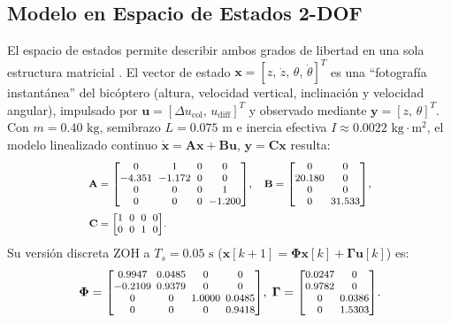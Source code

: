 \documentclass[conference]{IEEEtran}
\begin{document}
\subsection{Modelo en Espacio de Estados 2-DOF}
El espacio de estados permite describir ambos grados de libertad en una sola estructura matricial \cite{cayetano_ss}. El vector de estado $\mathbf{x} = [z,\, \dot{z},\, \theta,\, \dot{\theta}]^T$ es una ``fotograf\'{i}a instant\'{a}nea'' del bic\'{o}ptero (altura, velocidad vertical, inclinaci\'{o}n y velocidad angular), impulsado por $\mathbf{u} = [\Delta u_{\text{col}},\, u_{\text{diff}}]^T$ y observado mediante $\mathbf{y} = [z,\, \theta]^T$. Con $m = 0.40\text{ kg}$, semibrazo $L = 0.075\text{ m}$ e inercia efectiva $I \approx 0.0022\text{ kg}\cdot\text{m}^2$, el modelo linealizado continuo $\dot{\mathbf{x}} = \mathbf{A}\mathbf{x} + \mathbf{B}\mathbf{u}$, $\mathbf{y} = \mathbf{C}\mathbf{x}$ resulta:
\begin{equation}
  \setlength{\arraycolsep}{2.6pt}
  \footnotesize
  \begin{aligned}
    \mathbf{A} &=
    \begin{bmatrix}
      0 & 1 & 0 & 0 \\
      -4.351 & -1.172 & 0 & 0 \\
      0 & 0 & 0 & 1 \\
      0 & 0 & 0 & -1.200
    \end{bmatrix}\!,\quad
    \mathbf{B} =
    \begin{bmatrix}
      0 & 0 \\
      20.180 & 0 \\
      0 & 0 \\
      0 & 31.533
    \end{bmatrix}\!, \\
    \mathbf{C} &=
    \begin{bmatrix}
      1 & 0 & 0 & 0 \\
      0 & 0 & 1 & 0
    \end{bmatrix}\!.
  \end{aligned}
  \label{eq:ss_cont}
\end{equation}
Su versi\'{o}n discreta ZOH a $T_s = 0.05\text{ s}$ ($\mathbf{x}[k+1] = \mathbf{\Phi}\mathbf{x}[k] + \mathbf{\Gamma}\mathbf{u}[k]$) es:
\begin{equation}
  \setlength{\arraycolsep}{2.2pt}
  \footnotesize
  \mathbf{\Phi} =
  \begin{bmatrix}
    0.9947 & 0.0485 & 0 & 0 \\
    -0.2109 & 0.9379 & 0 & 0 \\
    0 & 0 & 1.0000 & 0.0485 \\
    0 & 0 & 0 & 0.9418
  \end{bmatrix}\!,\;
  \mathbf{\Gamma} =
  \begin{bmatrix}
    0.0247 & 0 \\
    0.9782 & 0 \\
    0 & 0.0386 \\
    0 & 1.5303
  \end{bmatrix}\!.
  \label{eq:ss_disc}
\end{equation}
\end{document}
